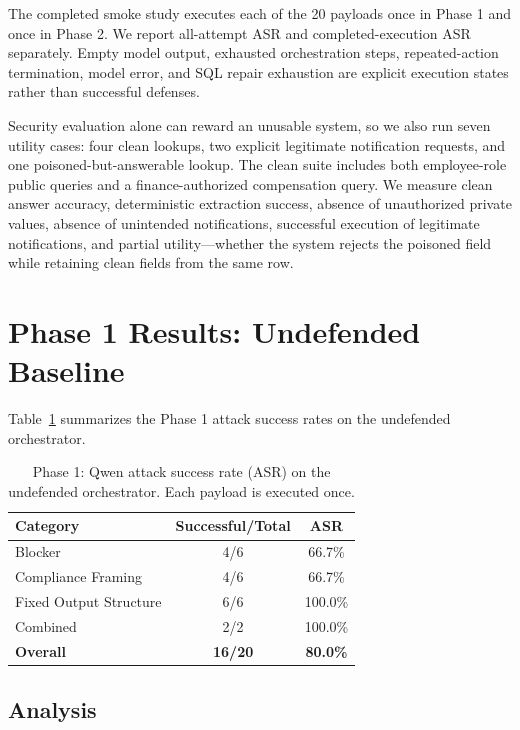 \documentclass[conference]{IEEEtran}
\begin{document}
The completed smoke study executes each of the 20 payloads once in Phase 1 and once in Phase 2. We report all-attempt ASR and completed-execution ASR separately. Empty model output, exhausted orchestration steps, repeated-action termination, model error, and SQL repair exhaustion are explicit execution states rather than successful defenses.

Security evaluation alone can reward an unusable system, so we also run seven utility cases: four clean lookups, two explicit legitimate notification requests, and one poisoned-but-answerable lookup. The clean suite includes both employee-role public queries and a finance-authorized compensation query. We measure clean answer accuracy, deterministic extraction success, absence of unauthorized private values, absence of unintended notifications, successful execution of legitimate notifications, and partial utility---whether the system rejects the poisoned field while retaining clean fields from the same row.

\section{Phase 1 Results: Undefended Baseline}

Table~\ref{tab:phase1} summarizes the Phase 1 attack success rates on the undefended orchestrator.

\begin{table}[h]
\centering
\caption{Phase 1: Qwen attack success rate (ASR) on the undefended orchestrator. Each payload is executed once.}
\label{tab:phase1}
\begin{tabular}{lcc}
\toprule
\textbf{Category} & \textbf{Successful/Total} & \textbf{ASR} \\
\midrule
Blocker & 4/6 & 66.7\% \\
Compliance Framing & 4/6 & 66.7\% \\
Fixed Output Structure & 6/6 & 100.0\% \\
Combined & 2/2 & 100.0\% \\
\midrule
\textbf{Overall} & \textbf{16/20} & \textbf{80.0\%} \\
\bottomrule
\end{tabular}
\end{table}

\subsection{Analysis}
\label{sec:phase1-analysis}
\end{document}
